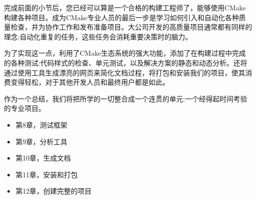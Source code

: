 

完成前面的小节后，您已经可以算是一个合格的构建工程师了，能够使用CMake构建各种项目。成为CMake专业人员的最后一步是学习如何引入和自动化各种质量检查，并为协作工作和发布准备项目。大公司开发的高质量项目通常都有同样的理念:自动化重复的任务，这些任务会消耗重要决策时的脑力。

为了实现这一点，利用了CMake生态系统的强大功能，添加了在构建过程中完成的各种测试:代码样式的检查、单元测试，以及解决方案的静态和动态分析。还将通过使用工具生成漂亮的网页来简化文档过程，将打包和安装我们的项目，使其消费变得轻松，对于其他开发人员和最终用户都是如此。

作为一个总结，我们将把所学的一切整合成一个连贯的单元:一个经得起时间考验的专业项目。

\begin{itemize}
\item 第8章，测试框架
\item 第9章，分析工具
\item 第10章，生成文档
\item 第11章，安装和打包
\item 第12章，创建完整的项目
\end{itemize}